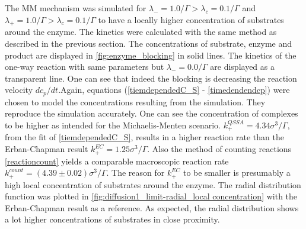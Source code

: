 \documentclass[
  a4paper,BCOR10mm,twoside,
  headsepline,footsepline,%
  fleqn,openbib
]{scrbook}
\begin{document}
The MM mechanism was simulated for $\lambda_{-}=1.0/\Gamma >\lambda_c=0.1/\Gamma$ and $\lambda_{+}=1.0/\Gamma>\lambda_c=0.1/\Gamma$ to have a locally higher concentration of substrates around the enzyme. The kinetics were calculated with the same method as described in the previous section. The concentrations of substrate, enzyme and product are displayed in \cref{fig:enzyme_blocking} in solid lines. The kinetics of the one-way reaction with same parameters but $\lambda_{-}=0.0/\Gamma $ are displayed as a transparent line. One can see that indeed the blocking is decreasing the reaction velocity $dc_p/dt$.Again,  equations (\ref{tiemdependedC_S} - \ref{timedendendcp})  were chosen to model the concentrations resulting from the simulation. They reproduce the simulation accurately. One can see the concentration of complexes to be higher as intended for the Michaelis-Menten scenario. $k^{QSSA}_{+}=4.34 \sigma^3/\Gamma$, from the fit of \cref{tiemdependedC_S}, results in a higher reaction rate than the Erban-Chapman result $k^{EC}_{+}=1.25 \sigma^3/\Gamma$. Also the method of counting reactions \cref{reactioncount} yields a comparable macroscopic reaction rate $k^{count}_{+}=(4.39\pm0.02) \sigma^3/\Gamma$. The reason for $k^{EC}_{+}$ to be smaller is presumably a high local concentration of substrates around the enzyme. The radial distribution function was plotted in \cref{fig:diffusion1_limit-radial_local concentration} with the Erban-Chapman result as a reference. As expected, the radial distribution shows a lot higher concentrations of substrates in close proximity.
\end{document}
